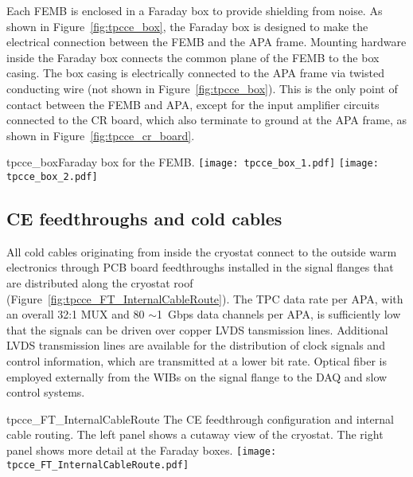 Each FEMB is enclosed in a Faraday box to provide shielding from noise. 
As shown in Figure~\ref{fig:tpcce_box}, the Faraday box is designed to make the electrical connection 
between the FEMB and the APA frame. %
 Mounting 
hardware inside the Faraday box connects the common plane of the FEMB to the box casing. The
box casing is electrically connected to the APA frame via twisted conducting wire (not 
shown in Figure~\ref{fig:tpcce_box}). This is the only point of contact between the FEMB and
APA, except for the input amplifier circuits connected to the CR board, which also terminate to
ground at the APA frame, as shown in Figure~\ref{fig:tpcce_cr_board}.

\begin{cdrfigure}{tpcce_box}{Faraday box for the FEMB.}
\texttt{[image: tpcce\_box\_1.pdf]}
\texttt{[image: tpcce\_box\_2.pdf]}
\end{cdrfigure}

%
\subsection{CE feedthroughs and cold cables}
\label{subsec:ce_feedthrough}

All cold cables originating from inside the cryostat connect to the outside warm electronics through PCB board feedthroughs
installed in the signal flanges that are distributed along the cryostat roof (Figure~\ref{fig:tpcce_FT_InternalCableRoute}).
The TPC data rate per APA, with an overall 32:1 MUX and 80 $\sim$1~Gbps data channels per APA,
is sufficiently low that the signals can be driven over copper LVDS tansmission lines.
Additional LVDS transmission lines are available for the distribution of clock signals and control information,
which are transmitted at a lower bit rate.
Optical fiber is employed externally from the WIBs on the signal flange to the DAQ and slow control systems.

\begin{cdrfigure}{tpcce_FT_InternalCableRoute}{
The CE feedthrough configuration and internal cable routing. The left panel shows a cutaway view of the cryostat.
The right panel shows more detail at the Faraday boxes.}
\texttt{[image: tpcce\_FT\_InternalCableRoute.pdf]}
\end{cdrfigure}


